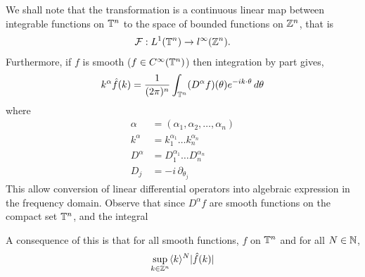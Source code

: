 \documentclass{article}
\begin{document}
We shall note that the transformation is a continuous linear map between integrable functions on ${\mathbb T}^n$ to the space of bounded functions on ${\mathbb Z}^n$, that is
\begin{align*}
{\ensuremath {\cal F}} : L^1({\mathbb T}^n) \to l^\infty({\mathbb Z}^n). 
\end{align*}
Furthermore, if $f$ is smooth ($f \in C^\infty({\mathbb T}^n)$) then integration by part gives, 
\begin{align} \label{eq: integration by parts} 
k^\alpha \hat{f}(k) = \frac{1}{(2 \pi)^n} \int_{{\mathbb T}^n} (D^\alpha f)(\theta) e^{-ik \cdot \theta} \, d\theta
\end{align}
where
\begin{align*}
\alpha &= (\alpha_1, \alpha_2, \dots, \alpha_n) \\
k^\alpha &= k^{\alpha_1}_1 \dots k^{\alpha_n}_n \\
D^\alpha &= D^{\alpha_1}_1 \dots D^{\alpha_n}_n \\
 D_j &= -i \, \partial_{\theta_j}
\end{align*}
This allow conversion of linear differential operators into algebraic expression in the frequency domain. Observe that since $D^\alpha f$ are smooth functions on the compact set ${\mathbb T}^n$, and the integral 

A consequence of this is that for all smooth functions, $f$ on ${\mathbb T}^n$ and for all $N \in {\ensuremath {\mathbb N}}$, 
\begin{align*}
\sup_{k \in {\ensuremath {\mathbb Z}}^n} \langle k \rangle^N |\hat{f}(k)| 
\end{align*}





 
\end{document}
